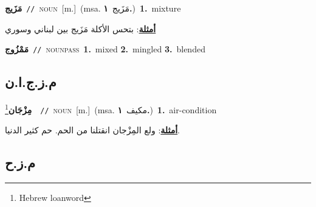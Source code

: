 \documentclass[10pt,a4paper,twoside]{article} %
\begin{document}
\begin{multicols}{2}
{\setlength\topsep{0pt}\textbf{\foreignlanguage{arabic}{مَزَيج}}\ {\color{gray}\texttt{//}\color{black}}\ \textsc{noun}\ [m.]\ \color{gray}(msa. \foreignlanguage{arabic}{مَزَيج}~\foreignlanguage{arabic}{\textbf{١.}})\color{black}\ \textbf{1.}~mixture\  \begin{flushright}\color{gray}\foreignlanguage{arabic}{\textbf{\underline{\foreignlanguage{arabic}{أمثلة}}}: بتحس الأكلة مَزَيج بين لبناني وسوري}\end{flushright}\color{black}} \vspace{2mm}

{\setlength\topsep{0pt}\textbf{\foreignlanguage{arabic}{مَمْزُوج}}\ {\color{gray}\texttt{//}\color{black}}\ \textsc{noun\textunderscore pass}\ \textbf{1.}~mixed  \textbf{2.}~mingled  \textbf{3.}~blended\ } \vspace{2mm}

\vspace{-3mm}
\subsection*{\color{blue}\foreignlanguage{arabic}{م.ز.ج.ا.ن}\color{blue}{ (ntws)}} 

{\setlength\topsep{0pt}\textbf{\foreignlanguage{arabic}{مِزْجَان}}\footnote{Hebrew loanword}\ \ {\color{gray}\texttt{//}\color{black}}\ \textsc{noun}\ [m.]\ \color{gray}(msa. \foreignlanguage{arabic}{مكيف}~\foreignlanguage{arabic}{\textbf{١.}})\color{black}\ \textbf{1.}~air-condition\  \begin{flushright}\color{gray}\foreignlanguage{arabic}{\textbf{\underline{\foreignlanguage{arabic}{أمثلة}}}: ولع المِزْجان انقتلنا من الحم. حم كثير الدنيا.}\end{flushright}\color{black}} \vspace{2mm}

\vspace{-3mm}
\subsection*{\color{blue}\foreignlanguage{arabic}{م.ز.ح}\color{blue}{}} 


\end{multicols}
\end{document}
